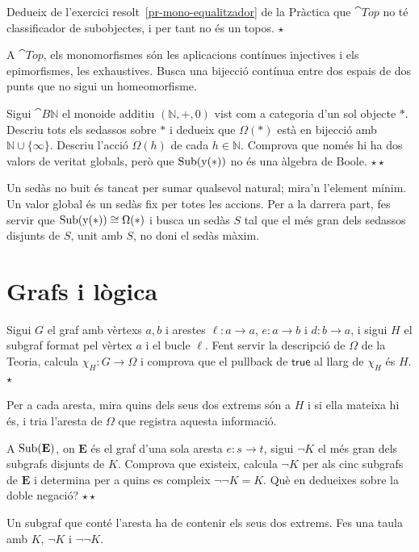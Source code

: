 \begin{exercici}
Dedueix de l'exercici resolt~\ref{pr-mono-equalitzador} de la Pràctica que $\cat{Top}$ no té classificador de subobjectes, i per tant no és un topos. \hfill{\normalfont$\star$}
\begin{indicacio}
A $\cat{Top}$, els monomorfismes són les aplicacions contínues injectives i els epimorfismes, les exhaustives. Busca una bijecció contínua entre dos espais de dos punts que no sigui un homeomorfisme.
\end{indicacio}
\end{exercici}

\begin{exercici}
Sigui $\cat{B}\mathbb N$ el monoide additiu $(\mathbb N,+,0)$ vist com a categoria d'un sol objecte $\ast$. Descriu tots els sedassos sobre $\ast$ i dedueix que $\Omega(\ast)$ està en bijecció amb $\mathbb N\cup\{\infty\}$. Descriu l'acció $\Omega(h)$ de cada $h\in\mathbb N$. Comprova que només hi ha dos valors de veritat globals, però que $\operatorname{Sub}(\mathrm{y}(\ast))$ no és una àlgebra de Boole. \hfill{\normalfont$\star\star$}
\begin{indicacio}
Un sedàs no buit és tancat per sumar qualsevol natural; mira'n l'element mínim. Un valor global és un sedàs fix per totes les accions. Per a la darrera part, fes servir que $\operatorname{Sub}(\mathrm{y}(\ast))\cong\Omega(\ast)$ i busca un sedàs $S$ tal que el més gran dels sedassos disjunts de $S$, unit amb $S$, no doni el sedàs màxim.
\end{indicacio}
\end{exercici}

\section{Grafs i lògica}

\begin{exercici}
Sigui $G$ el graf amb vèrtexs $a,b$ i arestes $\ell\colon a\to a$, $e\colon a\to b$ i $d\colon b\to a$, i sigui $H$ el subgraf format pel vèrtex $a$ i el bucle $\ell$. Fent servir la descripció de $\Omega$ de la Teoria, calcula $\chi_H\colon G\to\Omega$ i comprova que el pullback de $\mathsf{true}$ al llarg de $\chi_H$ és $H$. \hfill{\normalfont$\star$}
\begin{indicacio}
Per a cada aresta, mira quins dels seus dos extrems són a $H$ i si ella mateixa hi és, i tria l'aresta de $\Omega$ que registra aquesta informació.
\end{indicacio}
\end{exercici}

\begin{exercici}
A $\operatorname{Sub}(\mathbf E)$, on $\mathbf E$ és el graf d'una sola aresta $e\colon s\to t$, sigui $\neg K$ el més gran dels subgrafs disjunts de $K$. Comprova que existeix, calcula $\neg K$ per als cinc subgrafs de $\mathbf E$ i determina per a quins es compleix $\neg\neg K=K$. Què en dedueixes sobre la doble negació? \hfill{\normalfont$\star\star$}
\begin{indicacio}
Un subgraf que conté l'aresta ha de contenir els seus dos extrems. Fes una taula amb $K$, $\neg K$ i $\neg\neg K$.
\end{indicacio}
\end{exercici}
